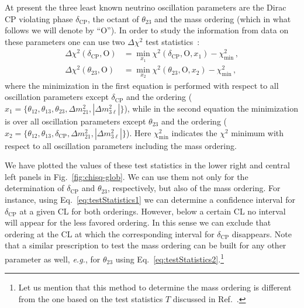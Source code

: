\documentclass[a4paper, 11pt]{article}
\newcommand{\Dmq}{\Delta m^2}
\begin{document}
At present the three least known neutrino oscillation parameters are
the Dirac CP violating phase $\delta_\text{CP}$, the octant of
$\theta_{23}$ and the mass ordering (which in what follows we will
denote by ``O'').  In order to study the information from data on
these parameters one can use two $\Delta\chi^2$ test
statistics~\cite{Elevant:2015ska, Blennow:2014sja}:
%
\begin{align}
  \label{eq:testStatistics1}
  \Delta\chi^2 \left(\delta_\text{CP}, \text{O} \right)
  &= \min_{x_1}
  \chi^2\left(\delta_\text{CP}, \text{O}, x_1\right) -\chi^2_\text{min} \,,
  \\
  \label{eq:testStatistics2}
  \Delta \chi^2\left(\theta_{23}, \text{O}\right)
  &= \min_{x_2}
  \chi^2\left(\theta_{23}, \text{O}, x_2\right) -\chi^2_\text{min} \,,
\end{align}
%
where the minimization in the first equation is performed with respect
to all oscillation parameters except $\delta_\text{CP}$ and the
ordering ($x_1 = \lbrace \theta_{12}, \theta_{13}, \theta_{23},
\Dmq_{21}, |\Dmq_{3\ell}| \rbrace$), while in the second equation the
minimization is over all oscillation parameters except $\theta_{23}$
and the ordering ($x_2 = \lbrace \theta_{12}, \theta_{13},
\delta_\text{CP}, \Dmq_{21}, |\Dmq_{3\ell}| \rbrace$). Here
$\chi^2_\text{min}$ indicates the $\chi^2$ minimum with respect to all
oscillation parameters including the mass ordering.

We have plotted the values of these test statistics in the lower right
and central left panels in Fig.~\ref{fig:chisq-glob}. We can use them
not only for the determination of $\delta_\text{CP}$ and
$\theta_{23}$, respectively, but also of the mass ordering. For
instance, using Eq.~\eqref{eq:testStatistics1} we can determine a
confidence interval for $\delta_\text{CP}$ at a given CL for both
orderings. However, below a certain CL no interval will appear for the
less favored ordering. In this sense we can exclude that ordering at
the CL at which the corresponding interval for $\delta_\text{CP}$
disappears. Note that a similar prescription to test the mass ordering
can be built for any other parameter as well, \textit{e.g.}, for
$\theta_{23}$ using Eq.~\eqref{eq:testStatistics2}.\footnote{Let us
  mention that this method to determine the mass ordering is different
  from the one based on the test statistics $T$ discussed in
  Ref.~\cite{Blennow:2013oma}.}
\end{document}

